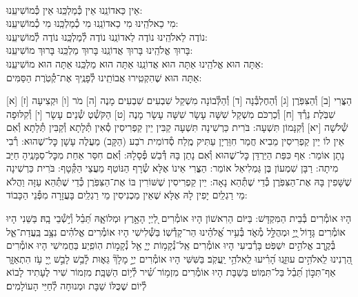 \documentclass[twoside, openany, parskip=half, 11pt]{book}
\begin{document}
\shabbossimshalom


\tachanunim

\\

\fullkaddish




\label{einkelokeinu}
\hfill אֵין כַּאדוֹנֵֽנוּ \hfill אֵין כְּ֯מַלְכֵּֽנוּ \hfill אֵין כְּ֯מוֹשִׁיעֵֽנוּ:\\
מִי כֵאלֹהֵֽינוּ \hfill מִי כַאדוֹנֵֽנוּ \hfill מִי כְ֯מַלְכֵּֽנוּ \hfill מִי כְ֯מוֹשִׁיעֵֽנוּ:\\
נוֹדֶה לֵאלֹהֵֽינוּ \hfill נוֹדֶה לַאדוֹנֵֽנוּ \hfill נוֹדֶה לְ֯מַלְכֵּֽנוּ \hfill נוֹדֶה לְ֯מוֹשִׁיעֵֽנוּ:\\
בָּרוּךְ אֱלֹהֵֽינוּ \hfill בָּרוּךְ אֲדוֹנֵֽנוּ \hfill בָּרוּךְ מַלְכֵּֽנוּ \hfill בָּרוּךְ מוֹשִׁיעֵֽנוּ:\\
אַתָּה הוּא אֱלֹהֵֽינוּ אַתָּה הוּא אֲדוֹנֵֽנוּ אַתָּה הוּא מַלְכֵּֽנוּ אַתָּה הוּא מוֹשִׁיעֵֽנוּ:\\
אַתָּה הוּא שֶׁהִקְטִֽירוּ אֲבוֹתֵֽינוּ לְ֯פָנֶֽיךָ אֶת־קְ֯טֹֽרֶת הַסַּמִּים:

\nextpage

[א] הַצֳּרִי [ב] וְ֯הַצִּפֹּֽרֶן [ג] וְ֯הַחֶלְבְּ֯נָה [ד] וְ֯הַלְּ֯בוֹנָה מִשְׁקַל שִׁבְעִים שִׁבְעִים מָנֶה [ה] מֹר [ו] וּקְצִיעָה [ז] שִׁבֹּֽלֶת נֵרְ֯דְּ [ח] וְ֯כַרְכֹּם מִשְׁקַל שִׁשָּׁה עָשָׂר שִׁשָּׁה עָשָׂר מָנֶה [ט] הַקֹּשְׁ֯טְ שְׁ֯נֵים עָשָׂר [י] וְ֯קִלּוּפָה שְׁ֯לֹשָׁה [יא] וְ֯קִנָּמוֹן תִּשְׁעָה: בֹּרִית כַּרְשִׁינָה תִּשְׁעָה קַבִּין יֵין קַפְרִיסִין סְ֯אִין תְּ֯לָתָא וְ֯קַבִּין תְּ֯לָתָא וְ֯אִם אֵין לוֹ יֵין קַפְרִיסִין מֵבִיא חֲמַר חִוַּרְיָן עַתִּיק מֶֽלַח סְ֯דוֹמִית רֹבַע (הַקָּב) מַעֲלֶה עָשָׁן כׇּל־שֶׁהוּא: רְ֯בִי נָתָן אוֹמֵר: אַף כִּפַּת הַיַּרְדֵּן כׇּל־שֶׁהוּא וְ֯אִם נָתַן בָּהּ דְּ֯בַשׁ פְּ֯סָלָהּ: וְ֯אִם חִסַּר אַחַת מִכׇּל־סַמָּנֶֽיהָ חַיַּב מִיתָה: רַבָּן שִׁמְעוֹן בֶּן גַּמְלִיאֵל אוֹמֵר: הַצֳּרִי אֵינוֹ אֶלָּא שְׂ֯רָף הַנּוֹטֵף מֵעֲצֵי הַקְּ֯טָף: בֹּרִית כַּרְשִׁינָה שֶׁשָּׁפִין בָּהּ אֶת־הַצִּפֹּֽרֶן כְּ֯דֵי שֶׁתְּ֯הֵא נָאָה: יֵין קַפְרִיסִין שֶׁשּׁוֹרִין בּוֹ אֶת־הַצִּפֹּֽרֶן כְּ֯דֵי שֶׁתְּ֯הֵא עַזָּה וַהֲלֹא מֵי רַגְלַֽיִם יָפִין לָהּ אֶלָּא שֶׁאֵין מַכְנִיסִין מֵי רַגְלַֽיִם בָּעֲזָרָה מִפְּ֯נֵי הַכָּבוֹד:

\vspace{-.3\baselineskip}
הָיוּ אוֹמְ֯רִים בְּ֯בֵית הַמִּקְדָּשׁ:
בַּיּוֹם הַרִאשׁוֹן הָיוּ אוֹמְ֯רִים לַ֭יְיָ הָאָ֣רֶץ וּמְלוֹאָ֑הּ תֵּ֝בֵ֗ל וְ֯י֣שְׁ֯בֵי בָֽהּ׃
בַּשֵּׁנִי הָיוּ אוֹמְ֯רִים גָּד֣וֹל ֖יְיָ֣ וּמְהֻלָּ֣ל מְ֯אֹ֑ד בְּ֯עִ֥יר אֱ֝לֹהֵ֗ינוּ הַר־קָדְ֯שֽׁוֹ׃
בַּשְּׁ֯לִישִׁי הָיוּ אוֹמְ֯רִים אֱלֹהִ֗ים נִצָּ֥ב בַּֽעֲדַת־אֵ֑ל בְּ֯קֶ֖רֶב אֱלֹהִ֣ים יִשְׁפֹּֽט׃ בָּרְ֯בִיעִי הָיוּ אוֹמְ֯רִים אֵֽל־נְ֯קָמ֥וֹת יְיָ֑ אֵ֖ל נְ֯קָמ֣וֹת הֽוֹפִֽיַע׃ בַּחֲמִישִׁי הָיוּ אוֹמְ֯רִים הַ֭רְנִינוּ לֵֽאלֹהִ֣ים עוּזֵּ֑נוּ הָ֝רִ֗יעוּ לֵֽאלֹהֵ֥י יַֽעֲקֹֽב׃ בַּשִּׁשִּׁי הָיוּ אוֹמְ֯רִים יְיָ֣ מָלָךְ֘ גֵּא֢וּת לָ֫בֵ֥שׁ לָבֵ֣שׁ יְ֖יָ עֹ֥ז הִתְאַזָּ֑ר אַף־תִּכּ֣וֹן תֵּ֝בֵ֗ל בַּל־תִּמּֽוֹט׃ בַּשַׁבָּת הָיוּ אוֹמְ֯רִים מִזְמ֥וֹר שִׁ֝֗יר לְ֯י֥וֹם הַשַּׁבָּֽת׃ מִזְמוֹר שִׁיר לֶעָתִיד לָבוֹא לְ֯יוֹם שֶׁכֻּלּוֹ שַׁבָּת וּמְנוּחָה לְ֯חַיֵּי הָעוֹלָמִים׃
\end{document}
